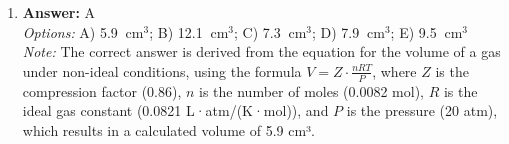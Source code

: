 \documentclass[12pt]{article}
\begin{document}
\begin{enumerate}[label=\arabic*.]
\\ \textit{Note:} The correct answer is accurate because each organic functional group has specific vibrational modes that correspond to distinct absorption frequencies in the infrared spectrum, enabling their identification and structural analysis.
\item \textbf{Answer:} A
\\ \textit{Options:} A) 5.9 $\mathrm{~cm}^3$; B) 12.1 $\mathrm{~cm}^3$; C) 7.3 $\mathrm{~cm}^3$; D) 7.9 $\mathrm{~cm}^3$; E) 9.5 $\mathrm{~cm}^3$
\\ \textit{Note:} The correct answer is derived from the equation for the volume of a gas under non-ideal conditions, using the formula \( V = Z \cdot \frac{nRT}{P} \), where \( Z \) is the compression factor (0.86), \( n \) is the number of moles (0.0082 mol), \( R \) is the ideal gas constant (0.0821 L·atm/(K·mol)), and \( P \) is the pressure (20 atm), which results in a calculated volume of 5.9 cm³.
\end{enumerate}
\end{document}
